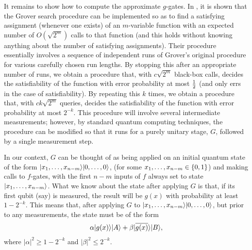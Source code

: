 It remains to show how to compute the approximate $g$-gates.
In \cite{BBHT96}, it is shown that the Grover search procedure can be 
implemented so as to find a satisfying assignment (whenever one exists) 
of an $m$-variable function with an expected number of $O(\sqrt{2^m})$ 
calls to that function (and this holds without knowing anything 
about the number of satisfying assignments).
Their procedure essentially involves a sequence of independent runs of 
Grover's original procedure for various carefully chosen run lengths.
By stopping this after an appropriate number of runs, we obtain a procedure 
that, with $c \sqrt{2^m}$ black-box calls, decides the satisfiability of 
the function with error probability at most $\textstyle{1 \over 2}$ (and only errs in 
the case of satisfiability).
By repeating this $k$ times, we obtain a procedure that, with $c k \sqrt{2^m}$ 
queries, decides the satisfiability of the function with error 
probability at most $2^{-k}$.
This procedure will involve several intermediate measurements; however, 
by standard quantum computing techniques, the procedure can be modified 
so that it runs for a purely unitary stage, $G$, followed by a single 
measurement step.

In our context,  $G$ can be thought of as being applied on 
an initial quantum state of the form 
$\mbox{$| x_1,\ldots,x_{n-m} \rangle$}\mbox{$| 0,\ldots,0 \rangle$}$, 
(for some $x_1,\ldots,x_{n-m} \in \01$) and making calls to $f$-gates, 
with the first $n-m$ inputs of $f$ always set to state 
$\mbox{$| x_1,\ldots,x_{n-m} \rangle$}$.
What we know about the state after applying $G$ is that, if its first qubit 
(say) is measured, the result will be $g(x)$ with probability at least 
$1 - 2^{-k}$.
This means that, after applying $G$ to 
$\mbox{$| x_1,\ldots,x_{n-m} \rangle$}\mbox{$| 0,\ldots,0 \rangle$}$, 
but prior to any measurements, the state must be of the form
\begin{equation}
\alpha \mbox{$| g(x) \rangle$}\mbox{$| A \rangle$} + \beta \mbox{$| \overline{g(x)} \rangle$}\mbox{$| B \rangle$},
\end{equation}
where $|\alpha|^2 \ge 1-2^{-k}$ and $|\beta|^2 \le 2^{-k}$.

